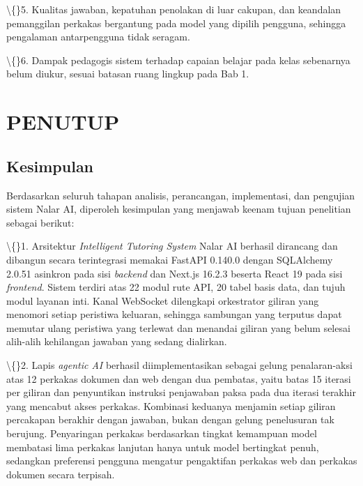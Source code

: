 \documentclass[12pt,a4paper]{article}
\begin{document}
\textbackslash\{\}5. Kualitas jawaban, kepatuhan penolakan di luar cakupan, dan keandalan pemanggilan perkakas bergantung pada model yang dipilih pengguna, sehingga pengalaman antarpengguna tidak seragam.



\textbackslash\{\}6. Dampak pedagogis sistem terhadap capaian belajar pada kelas sebenarnya belum diukur, sesuai batasan ruang lingkup pada Bab 1.



\section*{PENUTUP}

\subsection*{Kesimpulan}

Berdasarkan seluruh tahapan analisis, perancangan, implementasi, dan pengujian sistem Nalar AI, diperoleh kesimpulan yang menjawab keenam tujuan penelitian sebagai berikut:



\textbackslash\{\}1. Arsitektur \textit{Intelligent Tutoring System} Nalar AI berhasil dirancang dan dibangun secara terintegrasi memakai FastAPI 0.140.0 dengan SQLAlchemy 2.0.51 asinkron pada sisi \textit{backend} dan Next.js 16.2.3 beserta React 19 pada sisi \textit{frontend}. Sistem terdiri atas 22 modul rute API, 20 tabel basis data, dan tujuh modul layanan inti. Kanal WebSocket dilengkapi orkestrator giliran yang menomori setiap peristiwa keluaran, sehingga sambungan yang terputus dapat memutar ulang peristiwa yang terlewat dan menandai giliran yang belum selesai alih-alih kehilangan jawaban yang sedang dialirkan.



\textbackslash\{\}2. Lapis \textit{agentic AI} berhasil diimplementasikan sebagai gelung penalaran-aksi atas 12 perkakas dokumen dan web dengan dua pembatas, yaitu batas 15 iterasi per giliran dan penyuntikan instruksi penjawaban paksa pada dua iterasi terakhir yang mencabut akses perkakas. Kombinasi keduanya menjamin setiap giliran percakapan berakhir dengan jawaban, bukan dengan gelung penelusuran tak berujung. Penyaringan perkakas berdasarkan tingkat kemampuan model membatasi lima perkakas lanjutan hanya untuk model bertingkat penuh, sedangkan preferensi pengguna mengatur pengaktifan perkakas web dan perkakas dokumen secara terpisah.
\end{document}
